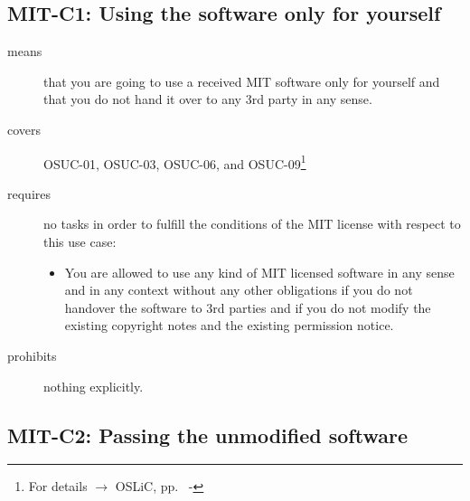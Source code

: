            


 

\subsection{MIT-C1: Using the software only for yourself}
\label{OSUC-01-MIT} 
\label{OSUC-03-MIT} 
\label{OSUC-06-MIT}
\label{OSUC-09-MIT}
  
\begin{description}
\item[means] that you are going to use a received MIT software only for yourself
and that you do not hand it over to any 3rd party in any sense.
\item[covers] OSUC-01, OSUC-03, OSUC-06, and OSUC-09\footnote{For details $\rightarrow$ OSLiC, pp.\
  \pageref{OSUC-01-DEF} - \pageref{OSUC-09-DEF}}
\item[requires] no tasks in order to fulfill the conditions of the MIT
license with respect to this use case:
  \begin{itemize}
    \item You are allowed to use any kind of MIT licensed software in any sense
    and in any context without any other obligations if you do not handover the
    software to 3rd parties and if you do not modify the existing copyright
    notes and the existing permission notice.
  \end{itemize}
\item[prohibits] nothing explicitly.
\end{description}

\subsection{MIT-C2: Passing the unmodified software}
\label{OSUC-02S-MIT} \label{OSUC-05S-MIT} \label{OSUC-07S-MIT} 
\label{OSUC-02B-MIT} \label{OSUC-05B-MIT} \label{OSUC-07B-MIT} 

